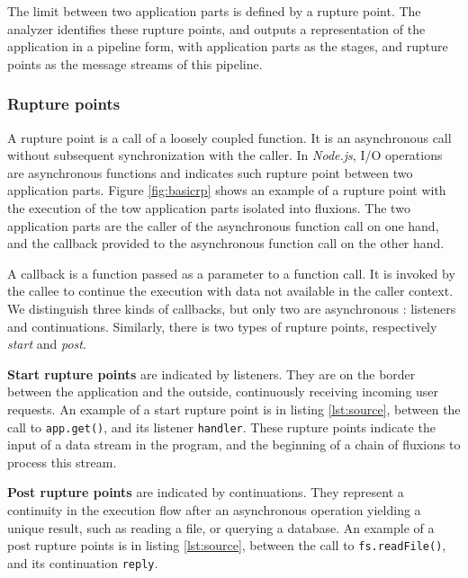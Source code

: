 The limit between two application parts is defined by a rupture point.
The analyzer identifies these rupture points, and outputs a representation of the application in a pipeline form, with application parts as the stages, and rupture points as the message streams of this pipeline.

\subsubsection{Rupture points} \label{section:compiler:analyzer:rupture}

A rupture point is a call of a loosely coupled function.
It is an asynchronous call without subsequent synchronization with the caller.
In \textit{Node.js}, I/O operations are asynchronous functions and indicates such rupture point between two application parts.
Figure \ref{fig:basicrp} shows an example of a rupture point with the execution of the tow application parts isolated into fluxions.
The two application parts are the caller of the asynchronous function call on one hand, and the callback provided to the asynchronous function call on the other hand.

A callback is a function passed as a parameter to a function call.
It is invoked by the callee to continue the execution with data not available in the caller context.
We distinguish three kinds of callbacks, but only two are asynchronous : listeners and continuations.
Similarly, there is two types of rupture points, respectively \textit{start} and \textit{post}.

\textbf{Start rupture points} are indicated by listeners. They are on the border between the application and the outside, continuously receiving incoming user requests.
An example of a start rupture point is in listing \ref{lst:source}, between the call to \texttt{app.get()}, and its listener \texttt{handler}.
These rupture points indicate the input of a data stream in the program, and the beginning of a chain of fluxions to process this stream.

\textbf{Post rupture points} are indicated by continuations.
They represent a continuity in the execution flow after an asynchronous operation yielding a unique result, such as reading a file, or querying a database.
An example of a post rupture points is in listing \ref{lst:source}, between the call to \texttt{fs.readFile()}, and its continuation \texttt{reply}.

